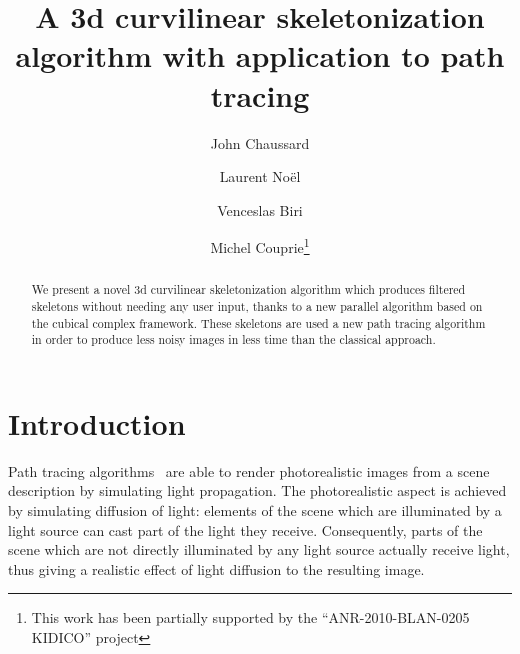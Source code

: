 \documentclass[final,envcountsame]{llncs}
\def\quotes#1{``#1''}
\begin{document}
\mainmatter

\title{A 3d curvilinear skeletonization algorithm with application to path tracing}
\author{John Chaussard \and Laurent No\"{e}l \and Venceslas Biri \and Michel Couprie\thanks{This work has been partially supported by the \quotes{ANR-2010-BLAN-0205 KIDICO} project}}


\maketitle


\begin{abstract}
We present a novel 3d curvilinear skeletonization algorithm which produces filtered skeletons without needing any user input, thanks to a new parallel algorithm based on the cubical complex framework. These skeletons are used a new path tracing algorithm in order to produce less noisy images in less time than the classical approach.
\end{abstract}



\section{Introduction}
\label{sec::intro}

Path tracing algorithms~\cite{Ka86,LW93} are able to render photorealistic images from a scene description by simulating light propagation. The photorealistic aspect is achieved by simulating diffusion of light: elements of the scene which are illuminated by a light source can cast part of the light they receive. Consequently, parts of the scene which are not directly illuminated by any light source actually receive light, thus giving a realistic effect of light diffusion to the resulting image. 
\end{document}
